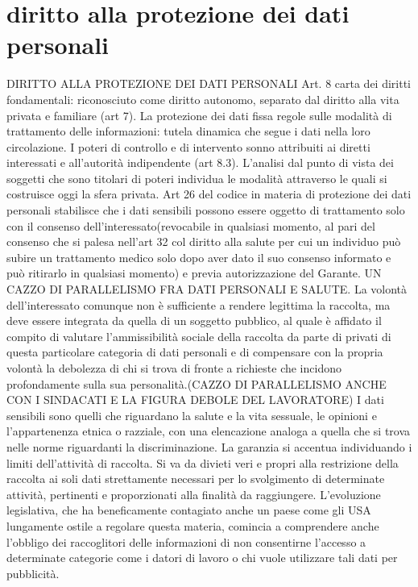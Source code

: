 \section{diritto alla protezione dei dati personali}

DIRITTO ALLA PROTEZIONE DEI DATI PERSONALI
Art. 8 carta dei diritti fondamentali: riconosciuto come diritto autonomo, separato dal diritto alla vita privata e familiare (art 7).
La protezione dei dati fissa regole sulle modalità di trattamento delle informazioni: tutela dinamica che segue i dati nella loro circolazione. I poteri di controllo e di intervento sonno attribuiti ai diretti interessati e all’autorità indipendente (art 8.3).
L’analisi dal punto di vista dei soggetti che sono titolari di poteri individua le modalità attraverso  le quali si costruisce oggi la sfera privata.
Art 26 del codice in materia di protezione dei dati personali stabilisce che i dati sensibili possono essere oggetto di trattamento solo con il consenso dell’interessato(revocabile in qualsiasi momento, al pari del consenso che si palesa nell’art 32 col diritto alla salute per cui un individuo può subire un trattamento medico solo dopo aver dato il suo consenso informato e può ritirarlo in qualsiasi momento) e previa autorizzazione del Garante.
UN CAZZO DI PARALLELISMO FRA DATI PERSONALI E SALUTE.
La volontà dell’interessato comunque non è sufficiente a  rendere legittima la raccolta, ma deve essere integrata da quella di un soggetto pubblico, al quale è affidato il compito di valutare l’ammissibilità sociale della raccolta da parte di privati di questa particolare categoria di dati personali e di compensare con la propria volontà la debolezza di chi si trova di fronte a richieste che incidono profondamente sulla sua personalità.(CAZZO DI PARALLELISMO ANCHE CON I SINDACATI E LA FIGURA DEBOLE DEL LAVORATORE) I dati sensibili sono quelli che riguardano la salute e la vita sessuale, le opinioni e l’appartenenza etnica o razziale, con una elencazione analoga a quella che si trova nelle norme riguardanti la discriminazione. La garanzia si accentua individuando i limiti dell’attività di raccolta. Si va da divieti veri e propri alla restrizione della raccolta ai soli dati strettamente necessari per lo svolgimento di determinate attività, pertinenti e proporzionati alla finalità da raggiungere. L’evoluzione legislativa, che ha beneficamente contagiato anche un paese come gli USA lungamente ostile a regolare questa materia, comincia a comprendere anche l’obbligo dei raccoglitori delle informazioni di non consentirne l’accesso a determinate categorie come i datori di lavoro o chi vuole utilizzare tali dati per pubblicità.
